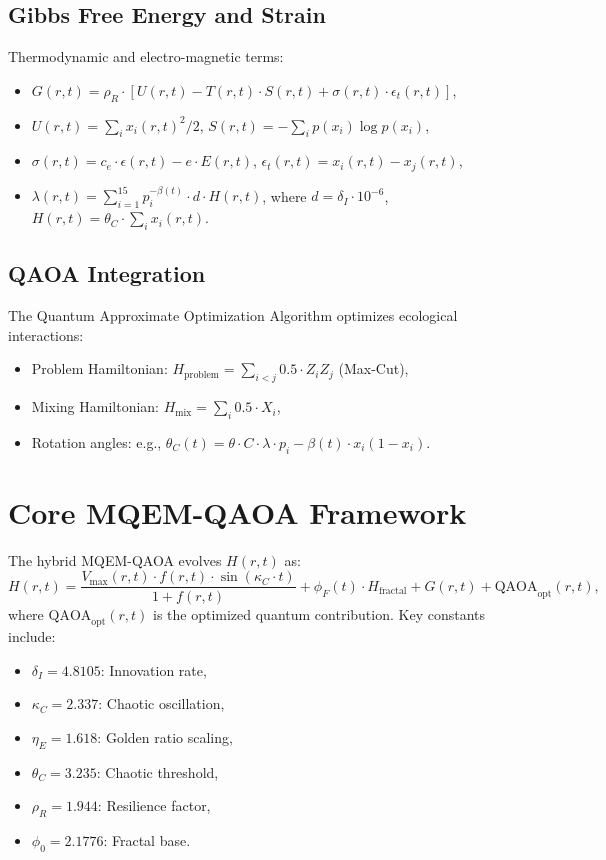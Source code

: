 \documentclass{article}
\theoremstyle{plain}
\begin{document}
\subsection{Gibbs Free Energy and Strain}
Thermodynamic and electro-magnetic terms:
\begin{itemize}
    \item \( G(r,t) = \rho_R \cdot [U(r,t) - T(r,t) \cdot S(r,t) + \sigma(r,t) \cdot \epsilon_t(r,t)] \),
    \item \( U(r,t) = \sum_i x_i(r,t)^2 / 2 \), \( S(r,t) = -\sum_i p(x_i) \log p(x_i) \),
    \item \( \sigma(r,t) = c_e \cdot \epsilon(r,t) - e \cdot E(r,t) \), \( \epsilon_t(r,t) = x_i(r,t) - x_j(r,t) \),
    \item \( \lambda(r,t) = \sum_{i=1}^{15} p_i^{-\beta(t)} \cdot d \cdot H(r,t) \), where \(d = \delta_I \cdot 10^{-6}\), \(H(r,t) = \theta_C \cdot \sum_i x_i(r,t)\).
\end{itemize}

\subsection{QAOA Integration}
The Quantum Approximate Optimization Algorithm optimizes ecological interactions:
\begin{itemize}
    \item Problem Hamiltonian: \( H_{\text{problem}} = \sum_{i < j} 0.5 \cdot Z_i Z_j \) (Max-Cut),
    \item Mixing Hamiltonian: \( H_{\text{mix}} = \sum_i 0.5 \cdot X_i \),
    \item Rotation angles: e.g., \(\theta_C(t) = \theta \cdot C \cdot \lambda \cdot p_i - \beta(t) \cdot x_i (1 - x_i)\).
\end{itemize}


\section{Core MQEM-QAOA Framework}
The hybrid MQEM-QAOA evolves \( H(r,t) \) as:
\begin{equation}
H(r,t) = \frac{V_{\text{max}}(r,t) \cdot f(r,t) \cdot \sin(\kappa_C \cdot t)}{1 + f(r,t)} + \phi_F(t) \cdot H_{\text{fractal}} + G(r,t) + \text{QAOA}_{\text{opt}}(r,t),
\end{equation}
where \( \text{QAOA}_{\text{opt}}(r,t) \) is the optimized quantum contribution. Key constants include:
\begin{itemize}
    \item \(\delta_I = 4.8105\): Innovation rate,
    \item \(\kappa_C = 2.337\): Chaotic oscillation,
    \item \(\eta_E = 1.618\): Golden ratio scaling,
    \item \(\theta_C = 3.235\): Chaotic threshold,
    \item \(\rho_R = 1.944\): Resilience factor,
    \item \(\phi_0 = 2.1776\): Fractal base.
\end{itemize}
\end{document}
